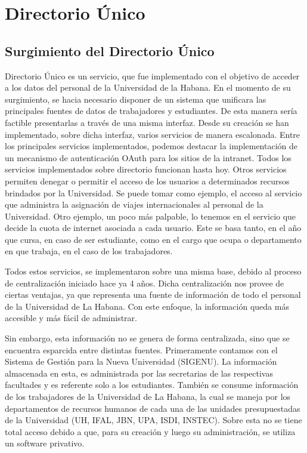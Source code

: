 \chapter{Directorio Único}

\section{Surgimiento del Directorio Único}

Directorio Único es un servicio, que fue implementado con el objetivo de acceder a los datos 
del personal de la Universidad de la Habana. En el momento de su surgimiento, se hacia 
necesario disponer de un sistema que unificara las principales fuentes de datos de 
trabajadores y estudiantes. De esta manera sería factible presentarlas a través de una misma
interfaz. Desde su creación se han implementado, sobre dicha interfaz, varios 
servicios de manera escalonada. Entre los principales servicios implementados, podemos 
destacar la implementación de un mecanismo de autenticación OAuth para los sitios de la 
intranet. Todos los servicios implementados sobre directorio funcionan hasta hoy. Otros 
servicios permiten denegar o permitir el acceso de los usuarios a determinados recursos 
brindados por la Universidad. Se puede tomar como ejemplo, el acceso al servicio que 
administra la asignación de viajes internacionales al personal de la Universidad. Otro 
ejemplo, un poco más palpable, lo tenemos en el servicio que decide la cuota de internet 
asociada a cada usuario. Este se basa tanto, en el año que cursa, en caso de ser estudiante,
como en el cargo que ocupa o departamento en que trabaja, en el caso de los trabajadores.

Todos estos servicios, se implementaron sobre una misma base, debido al proceso de 
centralización iniciado hace ya 4 años. Dicha centralización nos provee de ciertas ventajas,
ya que representa una fuente de información de todo el personal de la Universidad de La 
Habana. Con este enfoque, la información queda más accesible y más fácil de administrar. 

Sin embargo, esta información no se genera de forma centralizada, sino que se encuentra 
esparcida entre distintas fuentes. Primeramente contamos con el Sistema de Gestión para la 
Nueva Universidad (SIGENU). La información almacenada en esta, es administrada por las 
secretarias de las respectivas facultades y es referente solo a los estudiantes. También se
consume información de los trabajadores de la Universidad de La Habana, la cual se maneja 
por los departamentos de recursos humanos de cada una de las unidades presupuestadas de la 
Universidad (UH, IFAL, JBN, UPA, ISDI, INSTEC). Sobre esta no se tiene total 
acceso debido a que, para su creación y luego su administración, se utiliza un software 
privativo.

